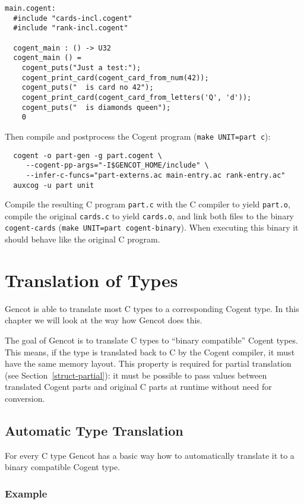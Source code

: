 \documentclass[a4paper]{report}
\newcommand{\code}[1]{\textnormal{\texttt{#1}}}
\begin{document}
\begin{verbatim}
main.cogent:
  #include "cards-incl.cogent"
  #include "rank-incl.cogent"

  cogent_main : () -> U32
  cogent_main () =
    cogent_puts("Just a test:");
    cogent_print_card(cogent_card_from_num(42));
    cogent_puts("  is card no 42");
    cogent_print_card(cogent_card_from_letters('Q', 'd'));
    cogent_puts("  is diamonds queen");
    0
\end{verbatim}

Then compile and postprocess the Cogent program (\code{make UNIT=part c}):
\begin{verbatim}
  cogent -o part-gen -g part.cogent \
     --cogent-pp-args="-I$GENCOT_HOME/include" \
     --infer-c-funcs="part-externs.ac main-entry.ac rank-entry.ac"
  auxcog -u part unit
\end{verbatim}

Compile the resulting C program \code{part.c} with the C compiler to yield \code{part.o},
compile the original \code{cards.c} to yield \code{cards.o}, and link both files to the binary
\code{cogent-cards} (\code{make UNIT=part cogent-binary}). When executing this binary it should
behave like the original C program.

\chapter{Translation of Types}
\label{types}

Gencot is able to translate most C types to a corresponding Cogent type. In this chapter we will look at the way 
how Gencot does this.

The goal of Gencot is to translate C types to ``binary compatible'' Cogent types. This means, if the type is 
translated back to C by the Cogent compiler, it must have the same memory layout. This property is required
for partial translation (see Section~\ref{struct-partial}): it must be possible to pass values between 
translated Cogent parts and original C parts at runtime without need for conversion.

\section{Automatic Type Translation}
\label{types-auto}

For every C type Gencot has a basic way how to automatically translate it to a binary compatible Cogent type. 

\subsection{Example}
\label{types-auto-example}
\end{document}

